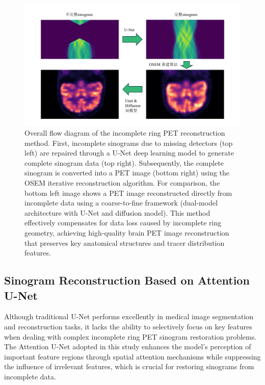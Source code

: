 \documentclass[
reprint,
superscriptaddress,
nofootinbib,
amsmath,amssymb,
aps,
prd,
]{revtex4-2}
\begin{document}
\begin{figure}[ht]
    \centering
    \includegraphics[width=\textwidth]{Images/reconstruction_workflow}
    \vspace{-.5cm}
    \caption{Overall flow diagram of the incomplete ring PET reconstruction method. First, incomplete sinograms due to missing detectors (top left) are repaired through a U-Net deep learning model to generate complete sinogram data (top right). Subsequently, the complete sinogram is converted into a PET image (bottom right) using the OSEM iterative reconstruction algorithm. For comparison, the bottom left image shows a PET image reconstructed directly from incomplete data using a coarse-to-fine framework (dual-model architecture with U-Net and diffusion model). This method effectively compensates for data loss caused by incomplete ring geometry, achieving high-quality brain PET image reconstruction that preserves key anatomical structures and tracer distribution features.}
    \vspace{-.2cm}
    \label{fig:reconstruction_workflow}
\end{figure}



\subsection{Sinogram Reconstruction Based on Attention U-Net}

Although traditional U-Net performs excellently in medical image segmentation and reconstruction tasks, it lacks the ability to selectively focus on key features when dealing with complex incomplete ring PET sinogram restoration problems. The Attention U-Net adopted in this study enhances the model's perception of important feature regions through spatial attention mechanisms while suppressing the influence of irrelevant features, which is crucial for restoring sinograms from incomplete data.
\end{document}
